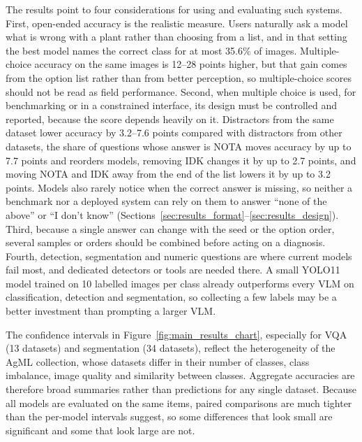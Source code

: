 \documentclass[10pt,letterpaper]{article}
\begin{document}
The results point to four considerations for using and evaluating such systems. First, open-ended accuracy is the realistic measure. Users naturally ask a model what is wrong with a plant rather than choosing from a list, and in that setting the best model names the correct class for at most 35.6\% of images. Multiple-choice accuracy on the same images is 12--28 points higher, but that gain comes from the option list rather than from better perception, so multiple-choice scores should not be read as field performance. Second, when multiple choice is used, for benchmarking or in a constrained interface, its design must be controlled and reported, because the score depends heavily on it. Distractors from the same dataset lower accuracy by 3.2--7.6 points compared with distractors from other datasets, the share of questions whose answer is NOTA moves accuracy by up to 7.7 points and reorders models, removing IDK changes it by up to 2.7 points, and moving NOTA and IDK away from the end of the list lowers it by up to 3.2 points. Models also rarely notice when the correct answer is missing, so neither a benchmark nor a deployed system can rely on them to answer ``none of the above'' or ``I don't know'' (Sections~\ref{sec:results_format}--\ref{sec:results_design}). Third, because a single answer can change with the seed or the option order, several samples or orders should be combined before acting on a diagnosis. Fourth, detection, segmentation and numeric questions are where current models fail most, and dedicated detectors or tools are needed there. A small YOLO11 model trained on 10 labelled images per class already outperforms every VLM on classification, detection and segmentation, so collecting a few labels may be a better investment than prompting a larger VLM.

The confidence intervals in Figure~\ref{fig:main_results_chart}, especially for VQA (13 datasets) and segmentation (34 datasets), reflect the heterogeneity of the AgML collection, whose datasets differ in their number of classes, class imbalance, image quality and similarity between classes. Aggregate accuracies are therefore broad summaries rather than predictions for any single dataset. Because all models are evaluated on the same items, paired comparisons are much tighter than the per-model intervals suggest, so some differences that look small are significant and some that look large are not.
\end{document}

